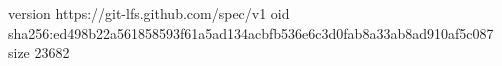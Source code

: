 version https://git-lfs.github.com/spec/v1
oid sha256:ed498b22a561858593f61a5ad134acbfb536e6c3d0fab8a33ab8ad910af5c087
size 23682
